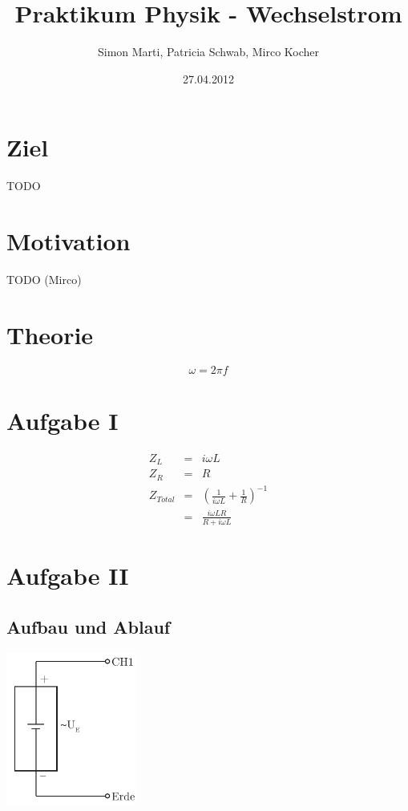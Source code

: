 \documentclass[12pt,a4paper]{article}
\title{Praktikum Physik - Wechselstrom}
\author{Simon Marti, Patricia Schwab, Mirco Kocher}
\date{27.04.2012}
\begin{document}
\maketitle

\section*{Ziel}
TODO


\section*{Motivation}
TODO (Mirco)


\section*{Theorie}
\begin{equation}
\omega = 2\pi f
\end{equation}


\section*{Aufgabe I}
\begin{eqnarray*}
Z_L & = & i \omega L \\
Z_R & = & R \\
Z_{Total} & = & \left( \frac{1}{i \omega L} + \frac{1}{R} \right) ^{-1} \\
& = & \frac{i \omega L R}{R + i \omega L}
\end{eqnarray*}


\section*{Aufgabe II}
\subsection*{Aufbau und Ablauf}
\includegraphics[height=5cm]{illustration2.pdf}
\end{document}
